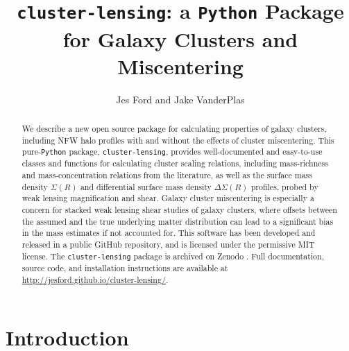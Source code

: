 \documentclass[twocolumn]{aastex6}
\newcommand{\code}{\lstinline[style=codeintext]}
\newcommand{\hcode}{\large\normalfont\texttt} %
\begin{document}
\title{\MakeLowercase{\hcode{cluster-lensing}}: a \hcode{P}\MakeLowercase{\hcode{ython}} Package for Galaxy Clusters and Miscentering}

\author{Jes Ford and Jake VanderPlas}


\shorttitle{\hcode{cluster-lensing}}


\begin{abstract}
We describe a new open source package for calculating properties of galaxy clusters, including NFW halo profiles with and without the effects of cluster miscentering. This pure-\code{Python} package, \code{cluster-lensing}, provides well-documented and easy-to-use classes and functions for calculating cluster scaling relations, including mass-richness and mass-concentration relations from the literature, as well as the surface mass density $\Sigma(R)$ and differential surface mass density $\Delta\Sigma(R)$ profiles, probed by weak lensing magnification and shear. Galaxy cluster miscentering is especially a concern for stacked weak lensing shear studies of galaxy clusters, where offsets between the assumed and the true underlying matter distribution can lead to a significant bias in the mass estimates if not accounted for. This software has been developed and released in a public GitHub repository, and is licensed under the permissive MIT license. The \code{cluster-lensing} package is archived on Zenodo \citep{clusterlensing}. Full documentation, source code, and installation instructions are available at \url{http://jesford.github.io/cluster-lensing/}.
\end{abstract}


\setcounter{section}{0}
\setcounter{subsection}{0}
\setcounter{subsubsection}{0}


\section{Introduction}
\label{intro}
\end{document}
